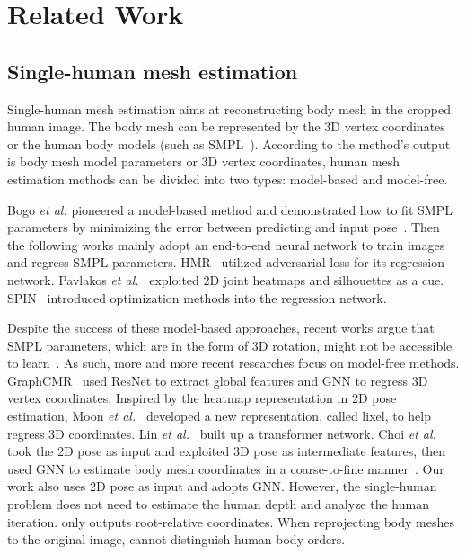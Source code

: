 \documentclass[runningheads]{llncs}
\begin{document}
\section{Related Work}
\subsection{Single-human mesh estimation}
Single-human mesh estimation aims at reconstructing body mesh in the cropped human image. The body mesh can be represented by the 3D vertex coordinates or the human body models (such as SMPL~\cite{loper2015smpl}). 
According to the method's output is body mesh model parameters or 3D vertex coordinates, human mesh estimation methods can be divided into two types: model-based and model-free. 

Bogo {\it et al.} pioneered a model-based method and demonstrated how to fit SMPL parameters by minimizing the error between predicting and input pose~\cite{bogo2016keep}.
Then the following works mainly adopt an end-to-end neural network to train images and regress SMPL parameters.
HMR~\cite{kanazawa2018end} utilized adversarial loss for its regression network.  
Pavlakos {\it et al.}~\cite{pavlakos2018learning} exploited 2D joint heatmaps and silhouettes as a cue. 
SPIN~\cite{kolotouros2019learning} introduced optimization methods into the regression network.

Despite the success of these model-based approaches, recent works argue that SMPL parameters, which are in the form of 3D rotation, might not be accessible to learn~\cite{kolotouros2019convolutional}. As such, more and more recent researches focus on model-free methods. 
GraphCMR~\cite{kolotouros2019convolutional} used ResNet to extract global features and GNN to regress 3D vertex coordinates. 
Inspired by the heatmap representation in 2D pose estimation, Moon {\it et al.}~\cite{moon2020i2l} developed a new representation, called lixel, to help regress 3D coordinates. 
Lin {\it et al.}~\cite{lin2021end} built up a transformer network.
Choi {\it et al.}~\cite{choi2020pose2mesh} took the 2D pose as input and exploited 3D pose as intermediate features, then used GNN to estimate body mesh coordinates in a coarse-to-fine manner~\cite{yu2019gradual}.
Our work also uses 2D pose as input and adopts GNN. However, the single-human problem does not need to estimate the human depth and analyze the human iteration. \cite{choi2020pose2mesh} only outputs root-relative coordinates. When reprojecting body meshes to the original image, \cite{choi2020pose2mesh} cannot distinguish human body orders.
\end{document}
